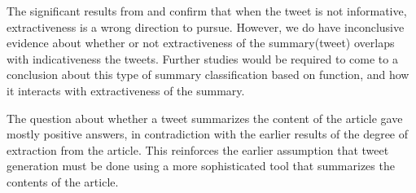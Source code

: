 The significant results from  and  confirm that when the tweet is not informative, extractiveness is a wrong direction to pursue. However, we do have inconclusive evidence about whether or not extractiveness of the summary(tweet) overlaps with indicativeness the tweets. Further studies would be required to come to a conclusion about this type of summary classification based on function, and how it interacts with extractiveness of the summary. 

The question about whether a tweet summarizes the content of the article gave mostly positive answers, in contradiction with the earlier results of the degree of extraction from the article. This reinforces the earlier assumption that tweet generation must be done using a more sophisticated tool that summarizes the contents of the article.



